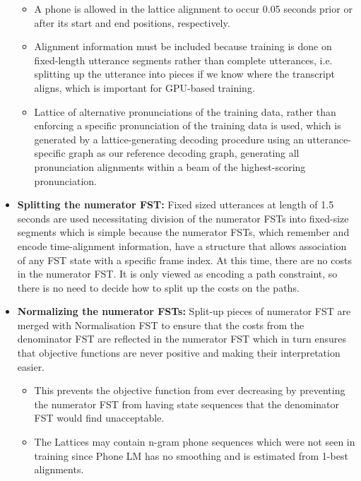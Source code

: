 \begin{itemize}
    \begin{itemize}
        \item A phone is allowed  in the lattice alignment to occur 0.05 seconds prior or after its start and end positions, respectively. 
        \item Alignment information must be included because training is done on fixed-length utterance segments rather than complete utterances, i.e. splitting up the utterance into pieces if we know where the transcript aligns, which is important for GPU-based training.
        \item Lattice of alternative pronunciations of the training data, rather than enforcing a specific pronunciation of the training data is used, which is generated by a lattice-generating decoding procedure using an utterance-specific graph as our reference decoding graph, generating all pronunciation alignments within a beam of the highest-scoring pronunciation.
    \end{itemize}
    \item \textbf{Splitting the numerator FST:} Fixed sized utterances at length of 1.5 seconds are used necessitating division of the numerator FSTs into fixed-size segments which is simple because the numerator FSTs, which remember and encode time-alignment information, have a structure that allows association of any FST state with a specific frame index. At this time, there are no costs in the numerator FST. It is only viewed as encoding a path constraint, so there is no need to decide how to split up the costs on the paths.   
    \item \textbf{Normalizing the numerator FSTs:} Split-up pieces of numerator FST are merged with Normalisation FST to ensure that the costs from the denominator FST are reflected in the numerator FST which in turn ensures that objective functions are never positive and making their interpretation easier. 
    \begin{itemize}
        \item This prevents the objective function from ever decreasing by preventing the numerator FST from having state sequences that the denominator FST would find unacceptable. %
        \item The Lattices may contain n-gram phone sequences which were not seen in training since Phone LM has no smoothing and is estimated from 1-best alignments.

\end{itemize}
\end{itemize}
